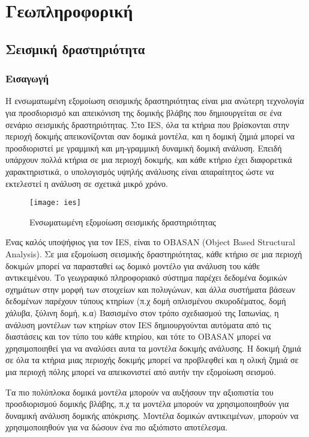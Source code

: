 \section{Γεωπληροφορική}

\subsection{Σεισμική δραστηριότητα}
\subsubsection{Εισαγωγή}
Η ενσωματωμένη εξομοίωση σεισμικής δραστηριότητας είναι μια ανώτερη τεχνολογία για προσδιορισμό και απεικόνιση της δομικής βλάβης που δημιουργείται σε ένα σενάριο σεισμικής δραστηριότητας. Στο IES, όλα τα κτήρια που βρίσκονται στην περιοχή δοκιμής απεικονίζονται σαν δομικά μοντέλα, και η δομική ζημιά μπορεί να προσδιοριστεί με γραμμική και μη-γραμμική δυναμική δομική ανάλυση. Επειδή υπάρχουν πολλά κτήρια σε μια περιοχή δοκιμής, και κάθε κτήριο έχει διαφορετικά χαρακτηριστικά, ο υπολογισμός υψηλής ανάλυσης είναι απαραίτητος ώστε να εκτελεστεί η ανάλυση σε σχετικά μικρό χρόνο.\cite{geoinformatics-1}

\begin{figure}[h]
\centering
\texttt{[image: ies]}
\caption{Ενσωματωμένη εξομοίωση σεισμικής δραστηριότητας\cite{figure-19}}
\end{figure}

Ένας καλός υποψήφιος για τον IES, είναι το OBASAN (Object Based Structural Analysis). Σε μια εξομοίωση σεισμικής δραστηριότητας, κάθε κτήριο σε μια περιοχή δοκιμών μπορεί να παρασταθεί ως δομικό μοντέλο για ανάλυση του κάθε αντικειμένου. Το γεωγραφικό πληροφοριακό σύστημα παρέχει δεδομένα δομικών σχημάτων στην μορφή των στοιχείων και πολυγώνων, και άλλα συστήματα βάσεων δεδομένων παρέχουν τύπους κτηρίων (π.χ δομή οπλισμένου σκυροδέματος, δομή χάλυβα, ξύλινη δομή, κ.α) Βασισμένο στον τρόπο σχεδιασμού της Ιαπωνίας, η ανάλυση μοντέλων των κτηρίων στον IES δημιουργούνται αυτόματα από τις διαστάσεις και τον τύπο του κάθε κτηρίου, και τότε το OBASAN μπορεί να χρησιμοποιηθεί για να αναλύσει αυτα τα μοντέλα δοκιμής ανάλυσης. Η δοκιμή ζημιά σε όλα τα κτήρια μιας περιοχής δοκιμής μπορεί να προβλεφθεί και η ολική ζημιά σε μια περιοχή πόλης μπορεί να απεικονιστεί από αυτήν την εξομοίωση σεισμού.\cite{geoinformatics-2}\cite{geoinformatics-3}

Τα πιο πολύπλοκα δομικά μοντέλα μπορούν να αυξήσουν την αξιοπιστία του προσδιορισμού δομικής βλάβης, π.χ τα μοντέλα μπορούν να χρησιμοποιηθούν για δυναμική ανάλυση δομικής απόκρισης. Μοντέλα δομικών αντικειμένων, μπορούν να χρησιμοποιηθούν για να δώσουν ένα πιο αξιόπιστο αποτέλεσμα. 


